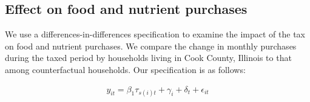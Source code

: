\documentclass[12pt]{article}
\begin{document}
%
%
%

\subsection{Effect on food and nutrient purchases}

We use a differences-in-differences specification to examine the impact of the tax on food and nutrient purchases. We compare the change in monthly purchases during the taxed period by households living in Cook County, Illinois to that among counterfactual households. Our specification is as follows:

\begin{align}
	y_{it} = \beta_1 \tau_{s(i)t} + \gamma_i + \delta_t + \epsilon_{it} \label{spec_did}
\end{align}
\end{document}
